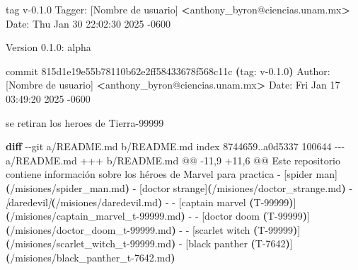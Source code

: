 \documentclass[
]{book}
\newenvironment{Shaded}{\begin{snugshade}}{\end{snugshade}}
\newcommand{\AttributeTok}[1]{\textcolor[rgb]{0.13,0.29,0.53}{#1}}
\newcommand{\ErrorTok}[1]{\textcolor[rgb]{0.64,0.00,0.00}{\textbf{#1}}}
\newcommand{\ExtensionTok}[1]{#1}
\newcommand{\FunctionTok}[1]{\textcolor[rgb]{0.13,0.29,0.53}{\textbf{#1}}}
\newcommand{\KeywordTok}[1]{\textcolor[rgb]{0.13,0.29,0.53}{\textbf{#1}}}
\newcommand{\NormalTok}[1]{#1}
\newcommand{\OperatorTok}[1]{\textcolor[rgb]{0.81,0.36,0.00}{\textbf{#1}}}
\newcommand{\PreprocessorTok}[1]{\textcolor[rgb]{0.56,0.35,0.01}{\textit{#1}}}
\newcommand{\SpecialStringTok}[1]{\textcolor[rgb]{0.31,0.60,0.02}{#1}}
\begin{document}
\begin{Shaded}
\begin{Highlighting}[]
\ExtensionTok{tag}\NormalTok{ v{-}0.1.0}
\ExtensionTok{Tagger:}\NormalTok{ [Nombre de usuario] }\OperatorTok{\textless{}}\NormalTok{anthony\_byron@ciencias.unam.mx}\OperatorTok{\textgreater{}}
\ExtensionTok{Date:}\NormalTok{   Thu Jan 30 22:02:30 2025 }\AttributeTok{{-}0600}

\ExtensionTok{Version}\NormalTok{ 0.1.0: alpha}

\ExtensionTok{commit}\NormalTok{ 815d1e19e55b78110b62e2ff58433678f568c11c }\ErrorTok{(}\ExtensionTok{tag:}\NormalTok{ v{-}0.1.0}\KeywordTok{)}
\ExtensionTok{Author:}\NormalTok{ [Nombre de usuario] }\OperatorTok{\textless{}}\NormalTok{anthony\_byron@ciencias.unam.mx}\OperatorTok{\textgreater{}}
\ExtensionTok{Date:}\NormalTok{   Fri Jan 17 03:49:20 2025 }\AttributeTok{{-}0600}

    \ExtensionTok{se}\NormalTok{ retiran los heroes de Tierra{-}99999}

\FunctionTok{diff} \AttributeTok{{-}{-}git}\NormalTok{ a/README.md b/README.md}
\ExtensionTok{index}\NormalTok{ 8744659..a0d5337 100644}
\ExtensionTok{{-}{-}{-}}\NormalTok{ a/README.md}
\ExtensionTok{+++}\NormalTok{ b/README.md}
\ExtensionTok{@@} \AttributeTok{{-}11,9}\NormalTok{ +11,6 @@ Este repositorio contiene información sobre los héroes de Marvel para practica}
   \ExtensionTok{{-}}\NormalTok{ [spider man]}\ErrorTok{(}\ExtensionTok{/misiones/spider\_man.md}\KeywordTok{)}
   \ExtensionTok{{-}}\NormalTok{ [doctor strange]}\ErrorTok{(}\ExtensionTok{/misiones/doctor\_strange.md}\KeywordTok{)}
   \ExtensionTok{{-}} \PreprocessorTok{[}\SpecialStringTok{daredevil}\PreprocessorTok{]}\ErrorTok{(}\ExtensionTok{/misiones/daredevil.md}\KeywordTok{)}
\ExtensionTok{{-}}  \AttributeTok{{-}}\NormalTok{ [captain marvel }\ErrorTok{(}\ExtensionTok{T{-}99999}\KeywordTok{)}\ExtensionTok{]}\ErrorTok{(}\ExtensionTok{/misiones/captain\_marvel\_t{-}99999.md}\KeywordTok{)}
\ExtensionTok{{-}}  \AttributeTok{{-}}\NormalTok{ [doctor doom }\ErrorTok{(}\ExtensionTok{T{-}99999}\KeywordTok{)}\ExtensionTok{]}\ErrorTok{(}\ExtensionTok{/misiones/doctor\_doom\_t{-}99999.md}\KeywordTok{)}
\ExtensionTok{{-}}  \AttributeTok{{-}}\NormalTok{ [scarlet witch }\ErrorTok{(}\ExtensionTok{T{-}99999}\KeywordTok{)}\ExtensionTok{]}\ErrorTok{(}\ExtensionTok{/misiones/scarlet\_witch\_t{-}99999.md}\KeywordTok{)}
   \ExtensionTok{{-}}\NormalTok{ [black panther }\ErrorTok{(}\ExtensionTok{T{-}7642}\KeywordTok{)}\ExtensionTok{]}\ErrorTok{(}\ExtensionTok{/misiones/black\_panther\_t{-}7642.md}\KeywordTok{)}
 

\end{Highlighting}
\end{Shaded}
\end{document}
